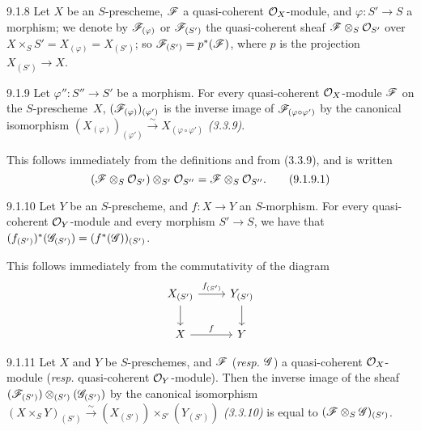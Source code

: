 \documentclass[../main.tex]{subfiles}
\begin{document}
\begin{cx}{9.1.8}
    Let $X$ be an $S$-prescheme, $\mathscr{F}$ a quasi-coherent $\mathcal{O}_X$-module, and $\varphi\colon S'\to S$ a morphism; we denote by $\mathscr{F}_{(\varphi)}$ or $\mathscr{F}_{(S')}$ the quasi-coherent sheaf $\mathscr{F}\otimes_S\mathcal{O}_{S'}$ over $X\times_S S'=X_{(\varphi)}=X_{(S')}$; so $\mathscr{F}_{(S')}=p^*(\mathscr{F})$, where $p$ is the projection $X_{(S')}\to X$.
\end{cx}

\begin{cx}[Proposition]{9.1.9}
    Let $\varphi''\colon S''\to S'$ be a morphism.
    For every quasi-coherent $\mathcal{O}_X$-module $\mathscr{F}$ on the $S$-prescheme~$X$, $(\mathscr{F}_{(\varphi)})_{(\varphi')}$ is the inverse image of $\mathscr{F}_{(\varphi\circ\varphi')}$ by the canonical isomorphism $(X_{(\varphi)})_{(\varphi')}\xrightarrow{\sim}X_{(\varphi\circ\varphi')}$ \emph{(3.3.9)}.
\end{cx}

This follows immediately from the definitions and from (3.3.9), and is written
\begin{equation*}
    (\mathscr{F}\otimes_S\mathcal{O}_{S'})\otimes_{S'}\mathcal{O}_{S''} = \mathscr{F}\otimes_S\mathcal{O}_{S''}.\tag{9.1.9.1}
\end{equation*}

\begin{cx}[Proposition]{9.1.10}
    Let $Y$ be an $S$-prescheme, and $f\colon X\to Y$ an $S$-morphism.
    For every quasi-coherent $\mathcal{O}_Y$-module and every morphism $S'\to S$, we have that $(f_{(S')})^*(\mathscr{G}_{(S')})=(f^*(\mathscr{G}))_{(S')}$.
\end{cx}

This follows immediately from the commutativity of the diagram
\begin{equation*}
    \begin{tikzcd}
        X_{(S')}
            \ar{r}{f_{(S')}}
            \ar{d}
        & Y_{(S')}
            \ar{d}\\
        X
            \ar{r}{f}
        & Y
    \end{tikzcd}
\end{equation*}

\begin{cx}[Corollary]{9.1.11}
    Let $X$ and $Y$ be $S$-preschemes, and $\mathscr{F}$ (\emph{resp.} $\mathscr{G}$) a quasi-coherent $\mathcal{O}_X$-module (\emph{resp.} quasi-coherent $\mathcal{O}_Y$-module).
    Then the inverse image of the sheaf $(\mathscr{F}_{(S')})\otimes_{(S')}(\mathscr{G}_{(S')})$ by the canonical isomorphism $(X\times_S Y)_{(S')}\xrightarrow{\sim}(X_{(S')})\times_{S'}(Y_{(S')})$ \emph{(3.3.10)} is equal to $(\mathscr{F}\otimes_S\mathscr{G})_{(S')}$.
\end{cx}
\end{document}
